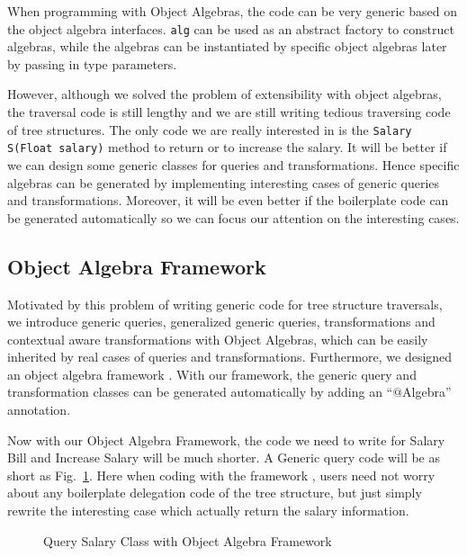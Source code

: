   
When programming with Object Algebras, the code can be very generic based on the object algebra interfaces. \lstinline{alg} can be used as an abstract factory to construct algebras, while the algebras can be instantiated by specific object algebras later by passing in type parameters. 

However, although we solved the problem of extensibility with object algebras, the traversal code is still lengthy and we are still writing tedious traversing code of tree structures. The only code we are really interested in is the \lstinline{Salary S(Float salary)} method to return or to increase the salary. It will be better if we can design some generic classes for queries and transformations. Hence specific algebras can be generated by
implementing interesting cases of generic queries and
transformations. Moreover, it will be even better if the boilerplate code can be generated automatically so we can focus our attention on the interesting cases.

\subsection{Object Algebra Framework}
Motivated by this problem of writing generic code for tree structure
traversals, we introduce generic queries, generalized generic queries, transformations and contextual aware transformations with Object Algebras, which can be easily inherited by real cases of queries and transformations. Furthermore, we designed an object algebra framework \name. With our framework, the generic query and transformation classes can be generated automatically by adding an ``$@$Algebra'' annotation.

Now with our Object Algebra Framework, the code we need to write for Salary Bill and Increase Salary will be much shorter. A Generic query code will be as short as Fig.~\ref{query_with_oaframework}. Here when coding with the framework \name, users need not worry about any boilerplate delegation code of the tree structure, but just simply rewrite the interesting case which actually return the salary information.
\begin{figure}[tb]
\vspace{-.1in}
\caption{Query Salary Class with Object Algebra Framework}
\label{query_with_oaframework}
\end{figure}

